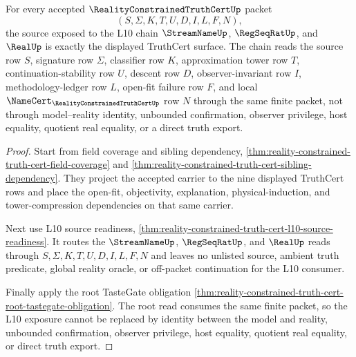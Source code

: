 \begin{theorem}
\label{thm:reality-constrained-truth-cert-l10-source-exposure}
For every accepted $\RealityConstrainedTruthCertUp$ packet
$$
(S,\Sigma,K,T,U,D,I,L,F,N),
$$
the source exposed to the L10 chain $\StreamNameUp$, $\RegSeqRatUp$, and
$\RealUp$ is exactly the displayed TruthCert surface. The chain reads the
source row $S$, signature row $\Sigma$, classifier row $K$, approximation tower
row $T$, continuation-stability row $U$, descent row $D$,
observer-invariant row $I$, methodology-ledger row $L$, open-fit failure row
$F$, and local $\NameCert_{\RealityConstrainedTruthCertUp}$ row $N$ through the
same finite packet, not through model--reality identity, unbounded
confirmation, observer privilege, host equality, quotient real equality, or a
direct truth export.
\end{theorem}
\begin{proof}
Start from field coverage and sibling dependency,
\autoref{thm:reality-constrained-truth-cert-field-coverage} and
\autoref{thm:reality-constrained-truth-cert-sibling-dependency}. They project
the accepted carrier to the nine displayed TruthCert rows and place the
open-fit, objectivity, explanation, physical-induction, and tower-compression
dependencies on that same carrier.

Next use L10 source readiness,
\autoref{thm:reality-constrained-truth-cert-l10-source-readiness}. It routes
the $\StreamNameUp$, $\RegSeqRatUp$, and $\RealUp$ reads through
$S,\Sigma,K,T,U,D,I,L,F,N$ and leaves no unlisted source, ambient truth
predicate, global reality oracle, or off-packet continuation for the L10
consumer.

Finally apply the root TasteGate obligation
\autoref{thm:reality-constrained-truth-cert-root-tastegate-obligation}. The
root read consumes the same finite packet, so the L10 exposure cannot be
replaced by identity between the model and reality, unbounded confirmation,
observer privilege, host equality, quotient real equality, or direct truth
export.
\end{proof}

